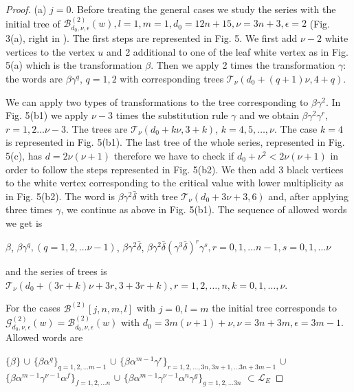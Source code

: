\documentclass{birkjour_t2}
\theoremstyle{definition}
\theoremstyle{remark}
\numberwithin{equation}{section}
\begin{document}
      \begin{proof}
 \bigskip\par 
(a) $j=0$. Before treating the general cases we study the series with the initial tree of ${\mathcal{B}}^{(2)}_{d_{0}, \nu, \epsilon}(w), l=1, m=1, d_{0}=12n+15, \nu=3n+3, \epsilon=2$ (Fig. 3(a), right in \cite{esc26}). The first steps are represented in Fig. 5. We first add $\nu-2$ white vertices to the vertex $u$ and 2 additional  to one of the leaf white vertex as in Fig. 5(a) which is the transformation $\beta$. Then we apply 2 times the transformation $\gamma$: the words are $\beta\gamma^q$, $q=1,2$ with corresponding trees $\mathcal{T}_{\nu}(d_{0}+(q+1)\nu, 4+q)$. 
\par
We can apply two types of transformations to the tree corresponding to $\beta\gamma^2$. In Fig. 5(b1) we apply $\nu-3$ times the substitution rule $\gamma$  and we obtain $\beta\gamma^2\gamma^r$, $r=1,2 \dots \nu-3$. The trees are $\mathcal{T}_{\nu}(d_{0}+k \nu, 3+k)$, $k=4, 5, \dots , \nu$. The case $k=4$ is represented in Fig. 5(b1). The last tree of the whole series, represented in Fig. 5(c), has $d=2\nu(\nu+1)$ therefore we have to check if $d_{0}+ \nu^2<2\nu(\nu+1)$ in order to follow the steps represented in Fig. 5(b2). We then add 3 black vertices to the white vertex corresponding to the critical value with lower multiplicity as in Fig. 5(b2). The word is  $\beta\gamma^2\bar{\delta}$ with tree $\mathcal{T}_{\nu}(d_{0}+3 \nu+3, 6)$ and, after applying three times $\gamma$, we continue as above in Fig. 5(b1). The sequence of allowed words we get is 
       \bigskip\par    
$\beta$,  $\beta\gamma^{q}, (q=1,2, \dots \nu-1)$, $\beta\gamma^{2}\bar{\delta}$, $\beta\gamma^{2}\bar{\delta}(\gamma^{3}\bar{\delta})^{r}\gamma^{s}, r=0, 1, \dots  n-1, s=0,1, \dots \nu$
       \bigskip\par\noindent  
and the series of trees is $\mathcal{T}_{\nu}(d_{0}+(3r+k) \nu+3r, 3+3r+k), r= 1, 2, \dots , n, k=0, 1, \dots,  \nu$. 
\par
For the cases ${\mathcal{B}}^{(2)}[j, n, m, l]$ with $j=0, l=m$ the initial tree corresponds to ${\mathcal{G}}^{(2)}_{d_{0},\nu,\epsilon}(w)={\mathcal{B}}^{(2)}_{d_{0},\nu,\epsilon}(w)$ with $d_{0}=3m(\nu+1) +\nu, \nu=3n+3m, \epsilon=3m-1$. Allowed words are
       \bigskip\par     
        $\{\beta\}$ $\cup$ $\{\beta\alpha^q\}_{q=1, 2, \dots m-1}$ $\cup$ $\{\beta\alpha^{m-1}\gamma^r\}_{r=1, 2, \dots , 3n, 3n+1, \dots  3n+3m-1}$ $\cup$  $\{\beta\alpha^{m-1}\gamma^{\nu-1}\alpha^f\}_{f=1, 2, \dots  n}$  $\cup$  $\{\beta\alpha^{m-1}\gamma^{\nu-1}\alpha^n\gamma^g\}_{g=1, 2, \dots  3n}$ $\subset \mathcal{L}_{E}$

\end{proof}
\end{document}
